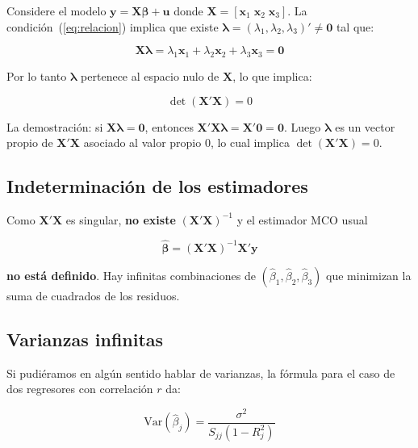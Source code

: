 \documentclass[12pt, letterpaper]{article}
\theoremstyle{remark}
\begin{document}
Considere el modelo $\mathbf{y} = \mathbf{X}\boldsymbol{\beta} + \mathbf{u}$
donde $\mathbf{X} = [\mathbf{x}_1 \;\mathbf{x}_2\;\mathbf{x}_3]$. La condición~(\ref{eq:relacion})
implica que existe $\boldsymbol{\lambda} = (\lambda_1,\lambda_2,\lambda_3)' \neq \mathbf{0}$
tal que:

\begin{equation}
  \mathbf{X}\boldsymbol{\lambda} = \lambda_1\mathbf{x}_1 + \lambda_2\mathbf{x}_2 + \lambda_3\mathbf{x}_3
  = \mathbf{0}
  \label{eq:nulo}
\end{equation}

\noindent Por lo tanto $\boldsymbol{\lambda}$ pertenece al espacio nulo de
$\mathbf{X}$, lo que implica:

\begin{equation}
  \det(\mathbf{X'X}) = 0
  \label{eq:det_cero}
\end{equation}

La demostración: si $\mathbf{X}\boldsymbol{\lambda} = \mathbf{0}$, entonces
$\mathbf{X'X}\boldsymbol{\lambda} = \mathbf{X'}\mathbf{0} = \mathbf{0}$. Luego
$\boldsymbol{\lambda}$ es un vector propio de $\mathbf{X'X}$ asociado al valor
propio 0, lo cual implica $\det(\mathbf{X'X}) = 0$.

\subsection{Indeterminación de los estimadores}

Como $\mathbf{X'X}$ es singular, \textbf{no existe} $(\mathbf{X'X})^{-1}$ y el
estimador MCO usual

\begin{equation}
  \hat{\boldsymbol{\beta}} = (\mathbf{X'X})^{-1}\mathbf{X'y}
  \label{eq:beta_mco}
\end{equation}

\noindent \textbf{no está definido}. Hay infinitas combinaciones de
$(\hat\beta_1, \hat\beta_2, \hat\beta_3)$ que minimizan la suma de cuadrados
de los residuos.

\subsection{Varianzas infinitas}

Si pudiéramos en algún sentido hablar de varianzas, la fórmula para el caso
de dos regresores con correlación $r$ da:

\begin{equation}
  \text{Var}(\hat\beta_j) = \frac{\sigma^2}{S_{jj}(1 - R_j^2)}
  \label{eq:var_vif}
\end{equation}
\end{document}
